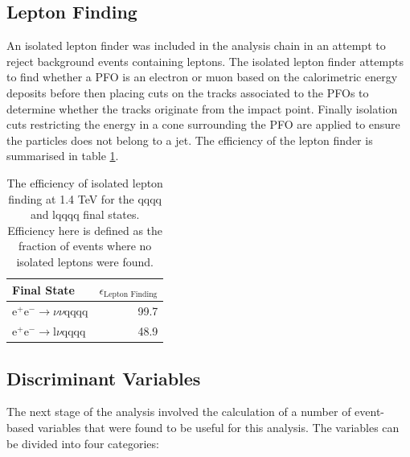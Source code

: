 
\subsection{Lepton Finding} 
\label{sec:isolatedleptonfinding}
An isolated lepton finder was included in the analysis chain in an attempt to reject background events containing leptons.  The isolated lepton finder attempts to find whether a PFO is an electron or muon based on the calorimetric energy deposits before then placing cuts on the tracks associated to the PFOs to determine whether the tracks originate from the impact point.  Finally isolation cuts restricting the energy in a cone surrounding the PFO are applied to ensure the particles does not belong to a jet.  The efficiency of the lepton finder is summarised in table \ref{table:efficiencyleptonfinding}.  

\begin{table}[h!]
\centering
\begin{tabular}{ l r }
\hline
Final State & $\epsilon_{\text{Lepton Finding}}$ \\ 
\hline
$\text{e}^{+}\text{e}^{-} \rightarrow \nu{\nu}\text{qqqq}$ & 99.7 \\
$\text{e}^{+}\text{e}^{-} \rightarrow \text{l}\nu\text{qqqq}$ & 48.9 \\
\hline
\end{tabular}
\caption[The efficiency of isolated lepton finding at 1.4 TeV for the {\nu}{\nu}qqqq and l{\nu}qqqq final states.]{The efficiency of isolated lepton finding at 1.4 TeV for the {\nu}{\nu}qqqq and l{\nu}qqqq final states.  Efficiency here is defined as the fraction of events where no isolated leptons were found.}
\label{table:efficiencyleptonfinding}
\end{table}


\subsection{Discriminant Variables} 
\label{sec:analysisprocessor}
The next stage of the analysis involved the calculation of a number of event-based variables that were found to be useful for this analysis.  The variables can be divided into four categories:

